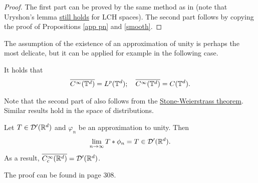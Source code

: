 \documentclass[
    a4paper,
    DIV=14,
    abstract=true,
    numbers=noenddot
]{scrartcl}
\begin{document}
\begin{proof}
	The first part can be proved by the same method as in  (note that Uryshon's lemma \href{https://planetmath.org/ApplicationsOfUrysohnsLemmaToLocallyCompactHausdorffSpaces}{still holds} for LCH spaces). The second part follows by copying the proof of Propositions \ref{app pn} and \ref{smooth}.
\end{proof}
The assumption of the existence of an approximation of unity is perhaps the most delicate, but it can be applied for example in the following case.
\begin{corollary}\label{Stone}
	It holds that
	\begin{align*}
		\overline{C^\infty(\mathbb{T}^d)}= L^p(\mathbb{T}^d); \quad \overline{C^\infty(\mathbb{T}^d)} = C(\mathbb{T}^d).
	\end{align*}
\end{corollary}
Note that the second part of  also follows from the \href{https://en.wikipedia.org/wiki/Stone%E2%80%93Weierstrass_theorem}{Stone-Weierstrass theorem}.
Similar results hold in the space of distributions.    \begin{proposition}
	Let $T\in \mathcal{D}'(\mathbb{R}^d)$ and $\varphi_n$ be an approximation to unity. Then
	\begin{align*}
		\lim_{n \to \infty} T* \phi_n= T \in \mathcal{D}'(\mathbb{R}^d).
	\end{align*}
	As a result, $\overline{C_c^\infty(\mathbb{R}^d)}=\mathcal{D}'(\mathbb{R}^d)$.
\end{proposition}
The proof can be found in \cite{leoni2017first} page 308.
\end{document}
